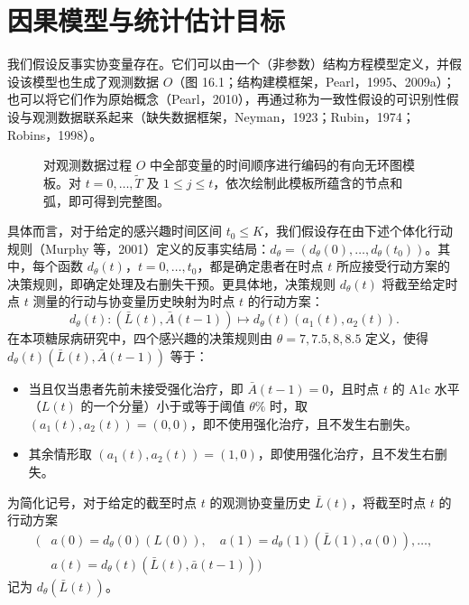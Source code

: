 \section{因果模型与统计估计目标}

我们假设反事实协变量存在。它们可以由一个（非参数）结构方程模型定义，并假设该模型也生成了观测数据 $O$（图 16.1；结构建模框架，Pearl，1995、2009a）；也可以将它们作为原始概念（Pearl，2010），再通过称为一致性假设的可识别性假设与观测数据联系起来（缺失数据框架，Neyman，1923；Rubin，1974；Robins，1998）。

\begin{figure}[htbp]
\centering

\caption{对观测数据过程 $O$ 中全部变量的时间顺序进行编码的有向无环图模板。对 $t=0,\ldots,\widetilde T$ 及 $1\leq j\leq t$，依次绘制此模板所蕴含的节点和弧，即可得到完整图。}
\label{fig:ch16-dag}
\end{figure}

具体而言，对于给定的感兴趣时间区间 $t_0\leq K$，我们假设存在由下述个体化行动规则（Murphy 等，2001）定义的反事实结局：$d_\theta=(d_\theta(0),\ldots,d_\theta(t_0))$。其中，每个函数 $d_\theta(t)$，$t=0,\ldots,t_0$，都是确定患者在时点 $t$ 所应接受行动方案的决策规则，即确定处理及右删失干预。更具体地，决策规则 $d_\theta(t)$ 将截至给定时点 $t$ 测量的行动与协变量历史映射为时点 $t$ 的行动方案：
\[
 d_\theta(t):(\bar L(t),\bar A(t-1))\mapsto d_\theta(t)(a_1(t),a_2(t)).
\]
在本项糖尿病研究中，四个感兴趣的决策规则由 $\theta=7,7.5,8,8.5$ 定义，使得 $d_\theta(t)(\bar L(t),\bar A(t-1))$ 等于：
\begin{itemize}
\item 当且仅当患者先前未接受强化治疗，即 $\bar A(t-1)=0$，且时点 $t$ 的 A1c 水平（$L(t)$ 的一个分量）小于或等于阈值 $\theta\%$ 时，取 $(a_1(t),a_2(t))=(0,0)$，即不使用强化治疗，且不发生右删失。
\item 其余情形取 $(a_1(t),a_2(t))=(1,0)$，即使用强化治疗，且不发生右删失。
\end{itemize}
为简化记号，对于给定的截至时点 $t$ 的观测协变量历史 $\bar L(t)$，将截至时点 $t$ 的行动方案
\[
\begin{aligned}
(&a(0)=d_\theta(0)(L(0)),\quad
 a(1)=d_\theta(1)(\bar L(1),a(0)),\ldots,\\
 &a(t)=d_\theta(t)(\bar L(t),\bar a(t-1)))
\end{aligned}
\]
记为 $d_\theta(\bar L(t))$。

